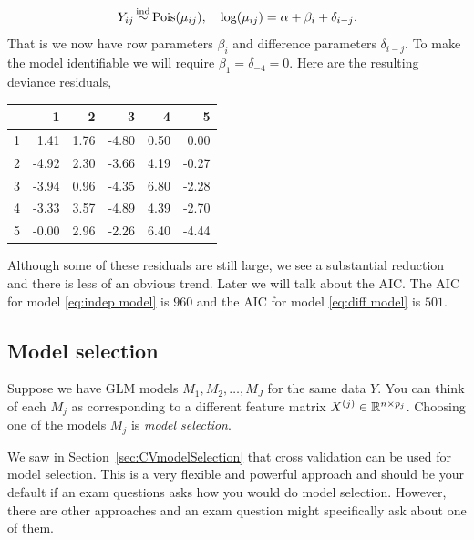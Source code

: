 \begin{example}
        \begin{equation}Y_{ij} \simind \mathrm{Pois}(\mu_{ij}), \quad \log(\mu_{ij}) = \alpha + \beta_i + \delta_{i-j}.  \label{eq:diff model}\end{equation}
        That is we now have row parameters $\beta_i$ and difference parameters $\delta_{i-j}$. To make the model identifiable we  will require $\beta_1 =\delta_{-4}= 0$. Here are the resulting deviance residuals,
        \begin{table}[ht]
            \centering
            \begin{tabular}{|r|rrrrr|}
              \hline
             & 1 & 2 & 3 & 4 & 5 \\ 
              \hline
            1 & 1.41 & 1.76 & -4.80 & 0.50 & 0.00 \\ 
              2 & -4.92 & 2.30 & -3.66 & 4.19 & -0.27 \\ 
              3 & -3.94 & 0.96 & -4.35 & 6.80 & -2.28 \\ 
              4 & -3.33 & 3.57 & -4.89 & 4.39 & -2.70 \\ 
              5 & -0.00 & 2.96 & -2.26 & 6.40 & -4.44 \\ 
               \hline
            \end{tabular}
            \end{table}
        Although some of these residuals are still large, we see a substantial reduction and there is less of an obvious trend. Later we will talk about the AIC. The AIC for model \eqref{eq:indep model} is $960$ and the AIC for model \eqref{eq:diff model} is $501$. 
\end{example}

\subsection{Model selection}

Suppose we have GLM models $M_1,M_2,\ldots,M_J$ for the same data $Y$. You can think of each $M_j$ as corresponding to a different feature matrix $X^{(j)} \in \mathbb{R}^{n \times p_j}$. Choosing one of the models $M_j$ is \emph{model selection}. 


We saw in Section~\ref{sec:CVmodelSelection} that cross validation can be used for model selection. This is a very flexible and powerful approach and should be your default if an exam questions asks how you would do model selection. However, there are other approaches and an exam question might specifically ask about one of them.




